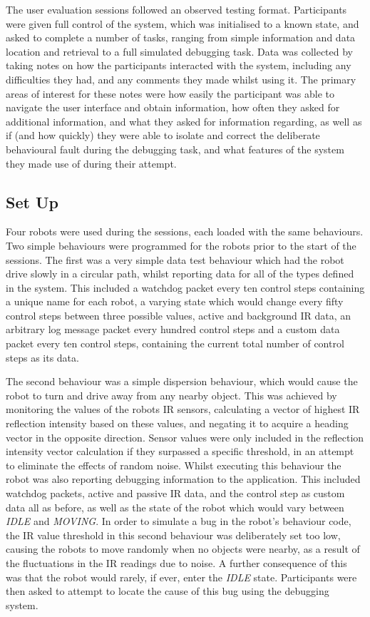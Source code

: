 The user evaluation sessions followed an observed testing format. Participants were given full control of the system, which was initialised to a known state, and asked to complete a number of tasks, ranging from simple information and data location and retrieval to a full simulated debugging task. Data was collected by taking notes on how the participants interacted with the system, including any difficulties they had, and any comments they made whilst using it. The primary areas of interest for these notes were how easily the participant was able to navigate the user interface and obtain information, how often they asked for additional information, and what they asked for information regarding, as well as if (and how quickly) they were able to isolate and correct the deliberate behavioural fault during the debugging task, and what features of the system they made use of during their attempt.

\subsection{Set Up}
Four robots were used during the sessions, each loaded with the same behaviours. Two simple behaviours were programmed for the robots prior to the start of the sessions. The first was a very simple data test behaviour which had the robot drive slowly in a circular path, whilst reporting data for all of the types defined in the system. This included a watchdog packet every ten control steps containing a unique name for each robot, a varying state which would change every fifty control steps between three possible values, active and background IR data, an arbitrary log message packet every hundred control steps and a custom data packet every ten control steps, containing the current total number of control steps as its data. 

The second behaviour was a simple dispersion behaviour, which would cause the robot to turn and drive away from any nearby object. This was achieved by monitoring the values of the robots IR sensors, calculating a vector of highest IR reflection intensity based on these values, and negating it to acquire a heading vector in the opposite direction. Sensor values were only included in the reflection intensity vector calculation if they surpassed a specific threshold, in an attempt to eliminate the effects of random noise. Whilst executing this behaviour the robot was also reporting debugging information to the application. This included watchdog packets, active and passive IR data, and the control step as custom data all as before, as well as the state of the robot which would vary between \textit{IDLE} and \textit{MOVING}. In order to simulate a bug in the robot's behaviour code, the IR value threshold in this second behaviour was deliberately set too low, causing the robots to move randomly when no objects were nearby, as a result of the fluctuations in the IR readings due to noise. A further consequence of this was that the robot would rarely, if ever, enter the \textit{IDLE} state. Participants were then asked to attempt to locate the cause of this bug using the debugging system.

